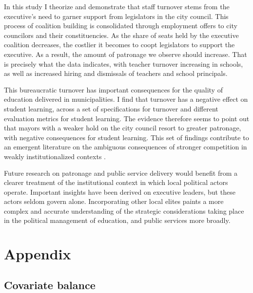 \documentclass[12pt,a4paper]{article}
\begin{document}
In this study I theorize and demonstrate that staff turnover stems from the executive's need to garner support from legislators in the city council. This process of coalition building is consolidated through employment offers to city councilors and their constituencies. As the share of seats held by the executive coalition decreases, the costlier it becomes to coopt legislators to support the executive. As a result, the amount of patronage we observe should increase. That is precisely what the data indicates, with teacher turnover increasing in schools, as well as increased hiring and dismissals of teachers and school principals.

This bureaucratic turnover has important consequences for the quality of education delivered in municipalities. I find that turnover has a negative effect on student learning, across a set of specifications for turnover and different evaluation metrics for student learning. The evidence therefore seems to point out that mayors with a weaker hold on the city council resort to greater patronage, with negative consequences for student learning. This set of findings contribute to an emergent literature on the ambiguous consequences of stronger competition in weakly institutionalized contexts \citep{gottlieb_countervailing_2019}.

Future research on patronage and public service delivery would benefit from a clearer treatment of the institutional context in which local political actors operate. Important insights have been derived on executive leaders, but these actors seldom govern alone. Incorporating other local elites paints a more complex and accurate understanding of the strategic considerations taking place in the political management of education, and public services more broadly.

\pagebreak 



\pagebreak

\section*{Appendix}

\subsection{Covariate balance}
\end{document}
